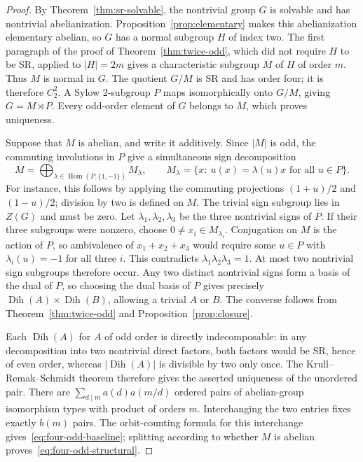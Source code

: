 \documentclass[11pt,a4paper]{amsart}
\theoremstyle{definition}
\theoremstyle{remark}
\numberwithin{equation}{section}
\begin{document}
\begin{proof}
By Theorem~\ref{thm:sr-solvable}, the nontrivial group $G$ is solvable
and has nontrivial abelianization. Proposition~\ref{prop:elementary}
makes this abelianization elementary abelian, so $G$ has
a normal subgroup $H$ of index two. The first paragraph of the proof
of Theorem~\ref{thm:twice-odd}, which did not require $H$ to be SR,
applied to $|H|=2m$ gives a characteristic subgroup $M$ of $H$ of
order $m$. Thus $M$ is normal in $G$. The quotient $G/M$ is SR and
has order four; it is therefore $C_2^2$. A Sylow $2$-subgroup $P$ maps
isomorphically onto $G/M$, giving $G=M\rtimes P$.
Every odd-order element of $G$ belongs to $M$, which proves uniqueness.

Suppose that $M$ is abelian, and write it additively. Since $|M|$ is odd,
the commuting involutions in $P$ give a simultaneous sign decomposition
\[
 M=\bigoplus_{\lambda\in\operatorname{Hom}(P,\{1,-1\})}M_\lambda,
 \qquad M_\lambda=\{x:\ u(x)=\lambda(u)x\text{ for all }u\in P\}.
\]
For instance, this follows by applying the commuting projections
$(1+u)/2$ and $(1-u)/2$; division by two is defined on $M$.
The trivial sign subgroup lies in $Z(G)$ and must be zero.
Let $\lambda_1,\lambda_2,\lambda_3$ be the three nontrivial signs of $P$.
If their three subgroups were nonzero, choose
$0\ne x_i\in M_{\lambda_i}$. Conjugation on $M$ is the action of $P$,
so ambivalence of $x_1+x_2+x_3$ would require some $u\in P$ with
$\lambda_i(u)=-1$ for all three $i$. This contradicts
$\lambda_1\lambda_2\lambda_3=1$. At most two nontrivial sign subgroups
therefore occur. Any two distinct nontrivial signs form a basis of the
dual of $P$, so choosing the dual basis of $P$ gives precisely
$\operatorname{Dih}(A)\times\operatorname{Dih}(B)$, allowing a trivial
$A$ or $B$. The converse follows from Theorem~\ref{thm:twice-odd}
and Proposition~\ref{prop:closure}.

Each $\operatorname{Dih}(A)$ for $A$ of odd order is directly
indecomposable: in any decomposition into two nontrivial direct
factors, both factors would be SR, hence of even order, whereas
$|\operatorname{Dih}(A)|$ is divisible by two only once.
The Krull--Remak--Schmidt theorem therefore gives the asserted
uniqueness of the unordered pair.
There are $\sum_{d\mid m}a(d)a(m/d)$ ordered pairs of abelian-group
isomorphism types with product of orders $m$. Interchanging the two
entries fixes exactly $b(m)$ pairs. The orbit-counting formula for
this interchange gives~\eqref{eq:four-odd-baseline}; splitting according
to whether $M$ is abelian proves~\eqref{eq:four-odd-structural}.
\end{proof}
\end{document}
